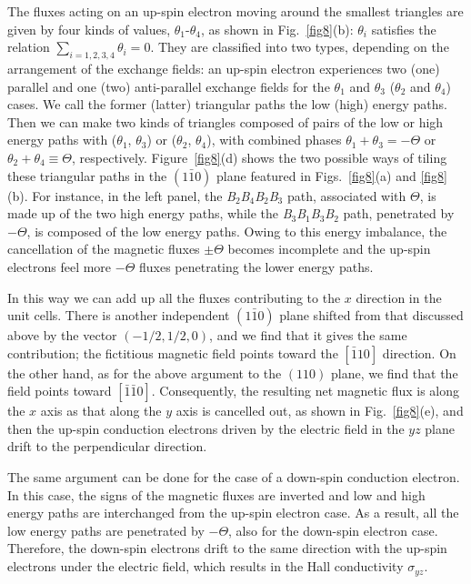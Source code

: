 \documentclass[aps,twocolumn,prb,preprintnumbers,amsmath,amssymb]{revtex4-2}
\begin{document}
The fluxes acting on an up-spin electron moving around the smallest triangles are given by four kinds of values, $\theta_1$-$\theta_4$, as shown in Fig.~\ref{fig8}(b): 
$\theta_i$ satisfies the relation $\sum_{i=1,2,3,4} \theta_i=0$. 
They are classified into two types, depending on the arrangement of the exchange fields: an up-spin electron experiences two (one) parallel and one (two) anti-parallel exchange fields for the $\theta_1$ and $\theta_3$ ($\theta_2$ and $\theta_4$) cases. 
We call the former (latter) triangular paths the low (high) energy paths.
Then we can make two kinds of 
triangles composed of pairs of the low or high energy paths with ($\theta_1$, $\theta_3$) or ($\theta_2$, $\theta_4$), 
 with combined phases  $\theta_1 + \theta_3 = - \Theta$ or $\theta_2 + \theta_4 \equiv \Theta$, respectively.
Figure~\ref{fig8}(d) shows the two possible ways of tiling these 
triangular paths in the $(1\bar{1}0)$ plane featured in Figs.~\ref{fig8}(a) and \ref{fig8}(b).
For instance, in the left panel, the {\it B}$_2${\it B}$_4${\it B}$_2${\it B}$_3$ path, associated with $\Theta$, is made up of the two high energy paths, 
while the {\it B}$_3${\it B}$_1${\it B}$_3${\it B}$_2$ path, penetrated by $-\Theta$, is composed of the low energy paths.
Owing to this energy imbalance, the cancellation of the magnetic fluxes $\pm \Theta$ becomes incomplete and the up-spin electrons feel more $-\Theta$ fluxes penetrating the lower energy paths. 

In this way we can add up all the fluxes contributing to the $x$ direction in the unit cells. 
There is another independent $(1\bar{1}0)$ plane shifted from that discussed above by the vector $(-1/2,1/2, 0)$, 
and we find that it gives the same contribution; the fictitious magnetic field points toward the $[\bar{1}10]$ direction.
On the other hand, as for the above argument to the $(110)$ plane, we find that the field points toward $[\bar{1}\bar{1}0]$. 
Consequently, the resulting net magnetic flux is along the $x$ axis as that along the $y$ axis is cancelled out, as shown in Fig.~\ref{fig8}(e), and 
then the up-spin conduction electrons driven by the electric field in the $yz$ plane drift to the perpendicular direction.

The same argument can be done for the case of a down-spin conduction electron. 
In this case, the signs of the magnetic fluxes are inverted and low and high energy paths are interchanged from the up-spin electron case.
As a result, all the low energy paths are penetrated by $-\Theta$, also for the down-spin electron case. 
Therefore, the down-spin electrons drift to the same direction with the up-spin electrons under the electric field, which results in the Hall conductivity $\sigma_{yz}$.
\end{document}
